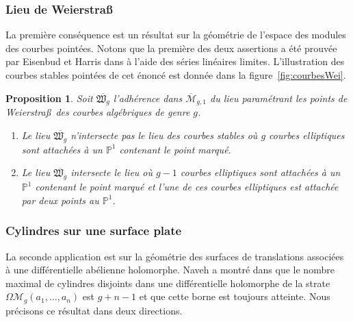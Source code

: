 \documentclass[JEP,XML,SOM,Unicode,francais,NoFloatCountersInSection,published]{cedram}
\let\mathcal\mathscr
\newenvironment{enumeratei}
{\bgroup\def\theenumi{\roman{enumi}}\def\theenumii{\arabic{enumii}}\begin{enumerate}}
{\end{enumerate}\egroup}
\newcommand{\PP}{{\mathbb{P}}}
\newcommand{\barmoduli}[1][g]{{\overline{\mathcal M}}_{\!#1}}
\newcommand{\omoduli}[1][g]{{\Omega\mathcal M}_{\!#1}}
\newcommand{\Weierstrass}{Weierstra\ss{}}
\newtheorem{prop}[thm]{Proposition}
\theoremstyle{definition}
\begin{document}
\subsubsection*{Lieu de \Weierstrass}
La première conséquence est un résultat sur la géométrie de l'espace des modules des courbes pointées. Notons que la première des deux assertions a été prouvée par Eisenbud et Harris dans \cite[Th.\,3.1]{eiha} à l'aide des séries linéaires limites. L'illustration des courbes stables pointées de cet énoncé est donnée dans la figure~\ref{fig:courbesWei}.
\begin{prop}\label{prop:limWei}
Soit $\overline{\mathfrak{W}_{g}}$ l'adhérence dans $\barmoduli[g,1]$ du lieu paramétrant les points de Weierstra\ss{}~des courbes algébriques de genre $g$.
\begin{enumeratei}
\item\label{prop:limWeii}
Le lieu $\overline{\mathfrak{W}_{g}}$ n’intersecte pas le lieu des courbes stables où $g$ courbes elliptiques sont attachées à un $\PP^{1}$ contenant le point marqué.
\item\label{prop:limWeiii}
Le lieu $\overline{\mathfrak{W}_{g}}$ intersecte le lieu où $g-1$ courbes elliptiques sont attachées à un~$\PP^{1}$ contenant le point marqué et l'une de ces courbes elliptiques est attachée par deux points au $\PP^{1}$.
\end{enumeratei}
\end{prop}

\subsubsection*{Cylindres sur une surface plate}
La seconde application est sur la géométrie des surfaces de translations associées à une différentielle abélienne holomorphe. Naveh a montré dans \cite{Na} que le nombre maximal de cylindres disjoints dans une différentielle holomorphe de la strate $\omoduli(a_{1},\dots,a_{n})$ est $g+n-1$ et que cette borne est toujours atteinte. Nous précisons ce résultat dans deux directions.
\end{document}
